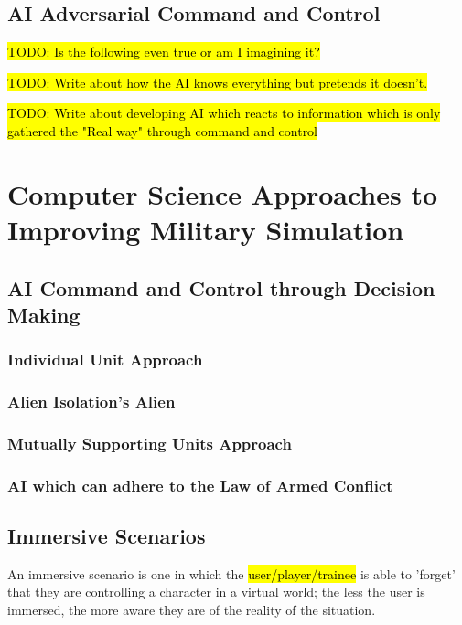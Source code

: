 \documentclass{article}
\begin{document}

\subsection{AI Adversarial Command and Control}

\hl{TODO: Is the following even true or am I imagining it?}

\hl{TODO: Write about how the AI knows everything but pretends it doesn't. }

\hl{TODO: Write about developing AI which reacts to information which is only gathered the "Real way" through command and control}

\section{Computer Science Approaches to Improving Military Simulation}

\subsection{AI Command and Control through Decision Making}

\subsubsection{Individual Unit Approach}

\subsubsection{Alien Isolation's Alien}

\subsubsection{Mutually Supporting Units Approach}

\subsubsection{AI which can adhere to the Law of Armed Conflict}

\subsection{Immersive Scenarios}

An immersive scenario is one in which the \hl{user/player/trainee} is able to 'forget' that they are controlling a character in a virtual world; the less the user is immersed, the more aware they are of the reality of the situation.
\end{document}
